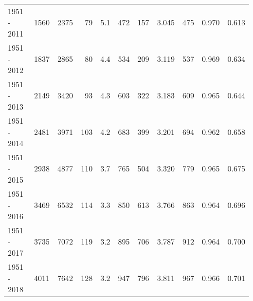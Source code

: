 \begin{tabular}{lrrrrrrrrrr}
1951 - 2011 &     1560 &     2375 &                79 &               5.1 &                     472 &                        157 &       3.045 &            475 &       0.970 &             0.613 \\
1951 - 2012 &     1837 &     2865 &                80 &               4.4 &                     534 &                        209 &       3.119 &            537 &       0.969 &             0.634 \\
1951 - 2013 &     2149 &     3420 &                93 &               4.3 &                     603 &                        322 &       3.183 &            609 &       0.965 &             0.644 \\
1951 - 2014 &     2481 &     3971 &               103 &               4.2 &                     683 &                        399 &       3.201 &            694 &       0.962 &             0.658 \\
1951 - 2015 &     2938 &     4877 &               110 &               3.7 &                     765 &                        504 &       3.320 &            779 &       0.965 &             0.675 \\
1951 - 2016 &     3469 &     6532 &               114 &               3.3 &                     850 &                        613 &       3.766 &            863 &       0.964 &             0.696 \\
1951 - 2017 &     3735 &     7072 &               119 &               3.2 &                     895 &                        706 &       3.787 &            912 &       0.964 &             0.700 \\
1951 - 2018 &     4011 &     7642 &               128 &               3.2 &                     947 &                        796 &       3.811 &            967 &       0.966 &             0.701 \\
\bottomrule
\end{tabular}
